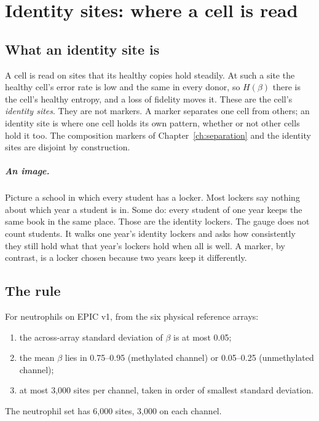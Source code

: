 \chapter{Identity sites: where a cell is read}\label{ch:identity}

\section{What an identity site is}

A cell is read on sites that its healthy copies hold steadily. At such a site the healthy cell's error rate is low and the same in every
donor, so $H(\beta)$ there is the cell's healthy entropy, and a loss of fidelity moves it. These are the cell's \emph{identity sites}. They are
not markers. A marker separates one cell from others; an identity site is where one cell holds its own pattern, whether or not other cells
hold it too. The composition markers of Chapter~\ref{ch:separation} and the identity sites are disjoint by construction.

\paragraph{An image.} Picture a school in which every student has a locker. Most lockers say nothing about which year a student is
in. Some do: every student of one year keeps the same book in the same place. Those are the identity lockers. The gauge does not
count students. It walks one year's identity lockers and asks how consistently they still hold what that year's lockers hold when
all is well. A marker, by contrast, is a locker chosen because two years keep it differently. \analogy

\section{The rule}

For neutrophils on EPIC v1, from the six physical reference arrays:
\begin{enumerate}
\item the across-array standard deviation of $\beta$ is at most 0.05;
\item the mean $\beta$ lies in 0.75--0.95 (methylated channel) or 0.05--0.25 (unmethylated channel);
\item at most 3,000 sites per channel, taken in order of smallest standard deviation.
\end{enumerate}
The neutrophil set has 6,000 sites, 3,000 on each channel. \calibrated

